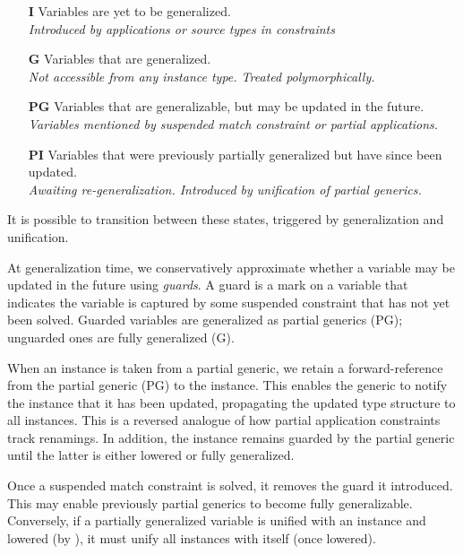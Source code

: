 \documentclass[acmsmall,screen,nonacm,review]{acmart}
\begin{document}
\begin{itemize}
  \item[\textbf{I}] Variables are yet to be generalized. \\
    \emph{Introduced by applications or source types in constraints} \\

  \item[\textbf{G}] Variables that are generalized. \\
    \emph{Not accessible from any instance type. Treated polymorphically.} \\

  \item[\textbf{PG}] Variables that are generalizable, but may be
    updated in the future. \\
    \emph{Variables mentioned by suspended match constraint or partial applications.} \\

  \item[\textbf{PI}] Variables that were previously partially generalized
    but have since been updated.  \\
    \emph{Awaiting re-generalization. Introduced by unification of partial generics.}
\end{itemize}


It is possible to transition between these states, triggered by generalization
and unification.

At generalization time, we conservatively approximate whether a variable may be
updated in the future using \emph{guards}. A guard is a mark on a variable that
indicates the variable is captured by some suspended constraint that has not
yet been solved. Guarded variables are generalized as partial generics (PG);
unguarded ones are fully generalized (G).

When an instance is taken from a partial generic, we retain a forward-reference
from the partial generic (PG) to the instance. This enables the generic to
notify the instance that it has been updated, propagating the updated type
structure to all instances. This is a reversed analogue of how partial
application constraints track renamings. In addition, the instance remains
guarded by the partial generic until the latter is either lowered or fully
generalized.

Once a suspended match constraint is solved, it removes the guard it
introduced. This may enable previously partial generics to become fully
generalizable. Conversely, if a partially generalized variable is unified with
an instance and lowered (\eg by ), it must unify all
instances with itself (once lowered).
\end{document}
